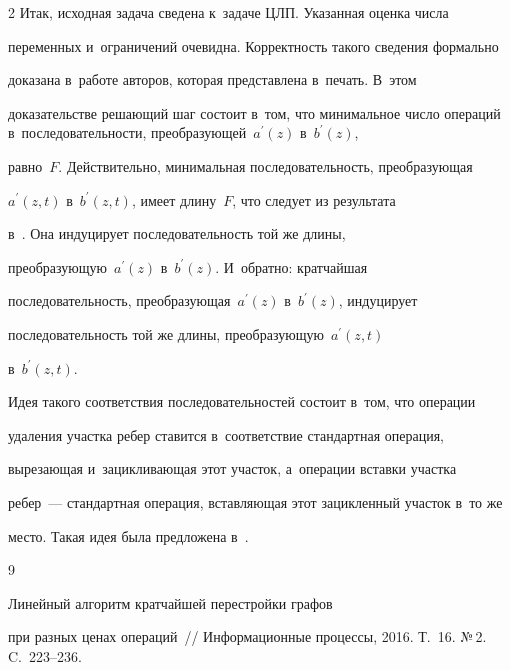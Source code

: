 \begin{multicols}{2}
  Итак, исходная задача сведена к~задаче ЦЛП. Указанная оценка числа 


переменных и~ограничений очевидна. Корректность такого сведения формально 


доказана в~работе авторов, которая пред\-став\-ле\-на в~печать. В~этом 


доказательстве решающий шаг состоит в~том, что минимальное число операций в~последовательности, преобразующей~$a^\prime(z)$ в~$b^\prime(z)$, 


равно~$F$. Действительно, минимальная последовательность, преобразующая 


$a^\prime(z, t)$ в~$b^\prime(z, t)$, имеет длину~$F$, что следует из результата 


в~\cite{2-gor}. Она индуцирует последовательность той же длины, 


преобразующую~$a^\prime(z)$ в~$b^\prime(z)$. И~обратно: кратчайшая 


последовательность, преобразующая~$a^\prime(z)$ в~$b^\prime(z)$, индуцирует 


последовательность той же длины, преобразующую~$a^\prime(z, t)$ 


в~$b^\prime(z, t)$. 


  


  Идея такого соответствия последовательностей состоит в~том, что операции 


удаления участка ребер ставится в~соответствие стандартная операция, 


вырезающая и~зацикливающая этот участок, а~операции вставки участка 


ребер~--- стандартная операция, вставляющая этот зацикленный участок в~то же 


место. Такая идея была предложена в~\cite{8-gor}.


  


{\small\frenchspacing


 {%




 \begin{thebibliography}{9}




 Линейный алгоритм кратчайшей перестройки графов 


при разных ценах операций~// Информационные процессы, 2016. Т.~16. №\,2. C.~223--236.



\end{thebibliography}}}
\end{multicols}
